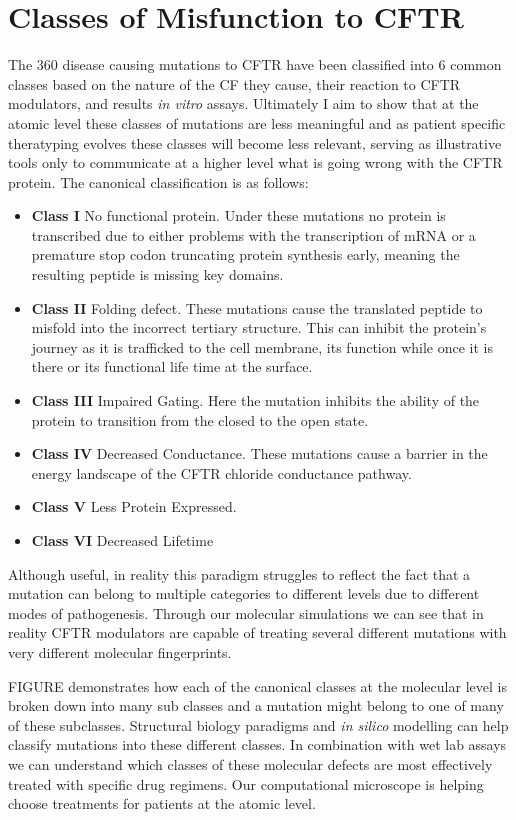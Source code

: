 \section{Classes of Misfunction to CFTR}
The 360 disease causing mutations to CFTR have been classified into 6 common classes based on the nature of the CF they cause, their reaction to CFTR modulators, and results \textit{in vitro} assays. Ultimately I aim to show that at the atomic level these classes of mutations are less meaningful and as patient specific theratyping evolves these classes will become less relevant, serving as illustrative tools only to communicate at a higher level what is going wrong with the CFTR protein. The canonical classification is as follows:
\begin{itemize}
	\item \textbf{Class I} No functional protein. Under these mutations no protein is transcribed due to either problems with the transcription of mRNA or a premature stop codon truncating protein synthesis early, meaning the resulting peptide is missing key domains. 
	\item \textbf{Class II} Folding defect. These mutations cause the translated peptide to misfold into the incorrect tertiary structure. This can inhibit the protein's journey as it is trafficked to the cell membrane, its function while once it is there or its functional life time at the surface. 
	\item \textbf{Class III} Impaired Gating. Here the mutation inhibits the ability of the protein to transition from the closed to the open state. 
	\item \textbf{Class IV} Decreased Conductance. These mutations cause a barrier in the energy landscape of the CFTR chloride conductance pathway.
	\item \textbf{Class V} Less Protein Expressed.  
	\item \textbf{Class VI} Decreased Lifetime

\end{itemize}

Although useful, in reality this paradigm struggles to reflect the fact that a mutation can belong to multiple categories to different levels due to different modes of pathogenesis. Through our molecular simulations we can see that in reality CFTR modulators are capable of treating several different mutations with very different molecular fingerprints.

FIGURE demonstrates how each of the canonical classes at the molecular level is broken down into many sub classes and a mutation might belong to one of many of these subclasses. Structural biology paradigms and \textit{in silico} modelling can help classify mutations into these different classes. In combination with wet lab assays we can understand which classes of these molecular defects are most effectively treated with specific drug regimens. Our computational microscope is helping choose treatments for patients at the atomic level. 

